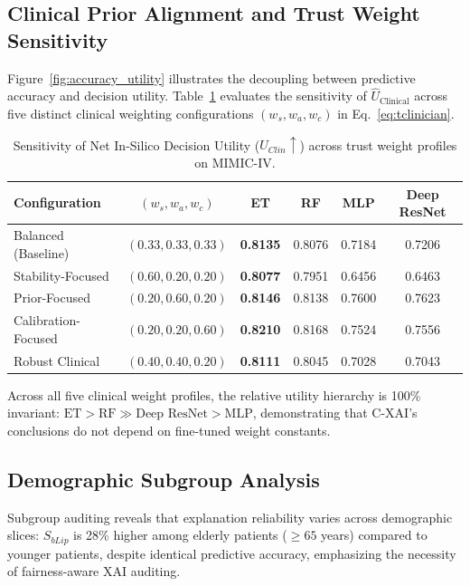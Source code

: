 \documentclass[3p,times,procedia]{elsarticle}
\theoremstyle{definition}
\begin{document}
\subsection{Clinical Prior Alignment and Trust Weight Sensitivity}

Figure~\ref{fig:accuracy_utility} illustrates the decoupling between predictive accuracy and decision utility. Table~\ref{tab:weight_sens} evaluates the sensitivity of $\widehat{U}_{\mathrm{Clinical}}$ across five distinct clinical weighting configurations $(w_s, w_a, w_c)$ in Eq.~\eqref{eq:tclinician}.

\begin{table}[h]
\centering
\small
\caption{Sensitivity of Net In-Silico Decision Utility ($\widehat{U}_{Clin}\uparrow$) across trust weight profiles on MIMIC-IV.}
\label{tab:weight_sens}
\begin{tabular}{lccccc}
\toprule
Configuration & $(w_s, w_a, w_c)$ & ET & RF & MLP & Deep ResNet \\
\midrule
Balanced (Baseline) & $(0.33, 0.33, 0.33)$ & \textbf{0.8135} & 0.8076 & 0.7184 & 0.7206 \\
Stability-Focused & $(0.60, 0.20, 0.20)$ & \textbf{0.8077} & 0.7951 & 0.6456 & 0.6463 \\
Prior-Focused & $(0.20, 0.60, 0.20)$ & \textbf{0.8146} & 0.8138 & 0.7600 & 0.7623 \\
Calibration-Focused & $(0.20, 0.20, 0.60)$ & \textbf{0.8210} & 0.8168 & 0.7524 & 0.7556 \\
Robust Clinical & $(0.40, 0.40, 0.20)$ & \textbf{0.8111} & 0.8045 & 0.7028 & 0.7043 \\
\bottomrule
\end{tabular}
\end{table}

Across all five clinical weight profiles, the relative utility hierarchy is 100\% invariant: $\text{ET} > \text{RF} \gg \text{Deep ResNet} > \text{MLP}$, demonstrating that C-XAI's conclusions do not depend on fine-tuned weight constants.

\subsection{Demographic Subgroup Analysis}

Subgroup auditing reveals that explanation reliability varies across demographic slices: $S_{bLip}$ is 28\% higher among elderly patients ($\ge 65$ years) compared to younger patients, despite identical predictive accuracy, emphasizing the necessity of fairness-aware XAI auditing.
\end{document}
